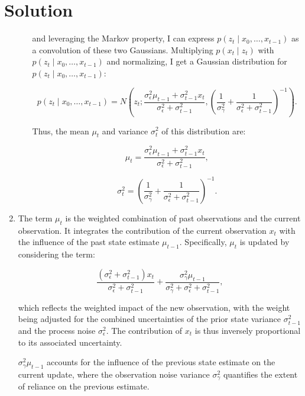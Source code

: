\documentclass[submit]{harvardml}
\newenvironment{solution}
  {\color{blue}\section*{Solution}}
{}
\begin{document}
\begin{solution}
\begin{enumerate}
\begin{enumerate}
and leveraging the Markov property, I can express \( p(z_t \mid x_0, \ldots, x_{t-1}) \) as a convolution of these two Gaussians. Multiplying \( p(x_t \mid z_t) \) with \( p(z_t \mid x_0, \ldots, x_{t-1}) \) and normalizing, I get a Gaussian distribution for \( p(z_t \mid x_0, \ldots, x_{t-1}) \):

\begin{equation*}
p(z_t \mid x_0, \ldots, x_{t-1}) = N\left(z_t; \frac{\sigma_{\epsilon}^2 \mu_{t-1} + \sigma_{t-1}^2 x_t}{\sigma_{\epsilon}^2 + \sigma_{t-1}^2}, \left(\frac{1}{\sigma_{\gamma}^2} + \frac{1}{\sigma_{\epsilon}^2 + \sigma_{t-1}^2}\right)^{-1}\right).
\end{equation*}

Thus, the mean \( \mu_t \) and variance \( \sigma_t^2 \) of this distribution are:

\begin{equation*}
\mu_t = \frac{\sigma_{\epsilon}^2 \mu_{t-1} + \sigma_{t-1}^2 x_t}{\sigma_{\epsilon}^2 + \sigma_{t-1}^2},
\end{equation*}

\begin{equation*}
\sigma_t^2 = \left(\frac{1}{\sigma_{\gamma}^2} + \frac{1}{\sigma_{\epsilon}^2 + \sigma_{t-1}^2}\right)^{-1}.
\end{equation*}
\end{enumerate}


\item The term \( \mu_t \) is the weighted combination of past observations and the current observation. It integrates the contribution of the current observation \( x_t \) with the influence of the past state estimate \( \mu_{t-1} \). Specifically, \( \mu_t \) is updated by considering the term:

\begin{equation*}
\frac{(\sigma_{\epsilon}^2 + \sigma_{t-1}^2)x_t}{\sigma_{\epsilon}^2 + \sigma_{t-1}^2} + \frac{\sigma_{\gamma}^2 \mu_{t-1}}{\sigma_{\gamma}^2 + \sigma_{\epsilon}^2 + \sigma_{t-1}^2},
\end{equation*}

which reflects the weighted impact of the new observation, with the weight being adjusted for the combined uncertainties of the prior state variance \( \sigma_{t-1}^2 \) and the process noise \( \sigma_{\epsilon}^2 \). The contribution of \( x_t \) is thus inversely proportional to its associated uncertainty.

\( \sigma_{\gamma}^2 \mu_{t-1} \) accounts for the influence of the previous state estimate on the current update, where the observation noise variance \( \sigma_{\gamma}^2 \) quantifies the extent of reliance on the previous estimate.


\end{enumerate}
\end{solution}
\end{document}
